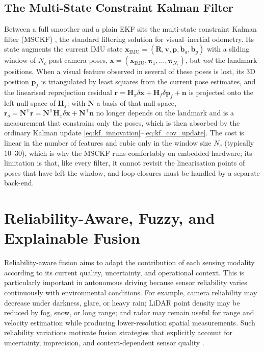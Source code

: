 \documentclass[graybox,envcountchap]{style/SNmono}
\begin{document}
\subsection{The Multi-State Constraint Kalman Filter}
\label{subsec:msckf}
Between a full smoother and a plain EKF sits the multi-state constraint Kalman filter (MSCKF) \cite{mourikis_multistate_2007}, the standard filtering solution for visual--inertial odometry. Its state augments the current IMU state $\mathbf{x}_{\mathrm{IMU}}=(\mathbf{R},\mathbf{v},\mathbf{p},\mathbf{b}_a,\mathbf{b}_g)$ with a sliding window of $N_c$ past camera poses, $\mathbf{x}=(\mathbf{x}_{\mathrm{IMU}},\boldsymbol{\pi}_1,\ldots,\boldsymbol{\pi}_{N_c})$, but \emph{not} the landmark positions. When a visual feature observed in several of these poses is lost, its 3D position $\mathbf{p}_f$ is triangulated by least squares from the current pose estimates, and the linearised reprojection residual $\mathbf{r}=\mathbf{H}_x\delta\mathbf{x}+\mathbf{H}_f\delta\mathbf{p}_f+\mathbf{n}$ is projected onto the left null space of $\mathbf{H}_f$: with $\mathbf{N}$ a basis of that null space, $\mathbf{r}_o=\mathbf{N}^{\mathsf T}\mathbf{r}=\mathbf{N}^{\mathsf T}\mathbf{H}_x\delta\mathbf{x}+\mathbf{N}^{\mathsf T}\mathbf{n}$ no longer depends on the landmark and is a measurement that constrains only the poses, which is then absorbed by the ordinary Kalman update \eqref{eq:kf_innovation}--\eqref{eq:kf_cov_update}. The cost is linear in the number of features and cubic only in the window size $N_c$ (typically $10$--$30$), which is why the MSCKF runs comfortably on embedded hardware; its limitation is that, like every filter, it cannot revisit the linearisation points of poses that have left the window, and loop closures must be handled by a separate back-end.

\section{Reliability-Aware, Fuzzy, and Explainable Fusion}




Reliability-aware fusion aims to adapt the contribution of each sensing modality according to its current quality, uncertainty, and operational context. This is particularly important in autonomous driving because sensor reliability varies continuously with environmental conditions. For example, camera reliability may decrease under darkness, glare, or heavy rain; LiDAR point density may be reduced by fog, snow, or long range; and radar may remain useful for range and velocity estimation while producing lower-resolution spatial measurements. Such reliability variations motivate fusion strategies that explicitly account for uncertainty, imprecision, and context-dependent sensor quality \cite{khaleghi_multisensor_2013, hall_introduction_1997}.
\end{document}
